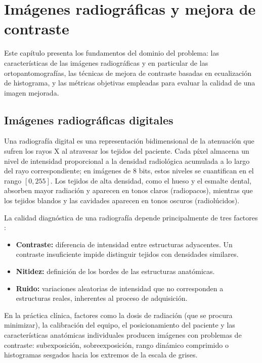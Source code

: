 \chapter{Imágenes radiográficas y mejora de contraste} %
\label{Chapter2}

Este capítulo presenta los fundamentos del dominio del problema: las características de las imágenes radiográficas y en particular de las ortopantomografías, las técnicas de mejora de contraste basadas en ecualización de histograma, y las métricas objetivas empleadas para evaluar la calidad de una imagen mejorada.

\section{Imágenes radiográficas digitales}

Una radiografía digital es una representación bidimensional de la atenuación que sufren los rayos X al atravesar los tejidos del paciente. Cada píxel almacena un nivel de intensidad proporcional a la densidad radiológica acumulada a lo largo del rayo correspondiente; en imágenes de 8 bits, estos niveles se cuantifican en el rango $[0, 255]$. Los tejidos de alta densidad, como el hueso y el esmalte dental, absorben mayor radiación y aparecen en tonos claros (radiopacos), mientras que los tejidos blandos y las cavidades aparecen en tonos oscuros (radiolúcidos).

La calidad diagnóstica de una radiografía depende principalmente de tres factores \citep{Gonzalez2018}:

\begin{itemize}
    \item \textbf{Contraste:} diferencia de intensidad entre estructuras adyacentes. Un contraste insuficiente impide distinguir tejidos con densidades similares.
    \item \textbf{Nitidez:} definición de los bordes de las estructuras anatómicas.
    \item \textbf{Ruido:} variaciones aleatorias de intensidad que no corresponden a estructuras reales, inherentes al proceso de adquisición.
\end{itemize}

En la práctica clínica, factores como la dosis de radiación (que se procura minimizar), la calibración del equipo, el posicionamiento del paciente y las características anatómicas individuales producen imágenes con problemas de contraste: subexposición, sobreexposición, rango dinámico comprimido o histogramas sesgados hacia los extremos de la escala de grises.

